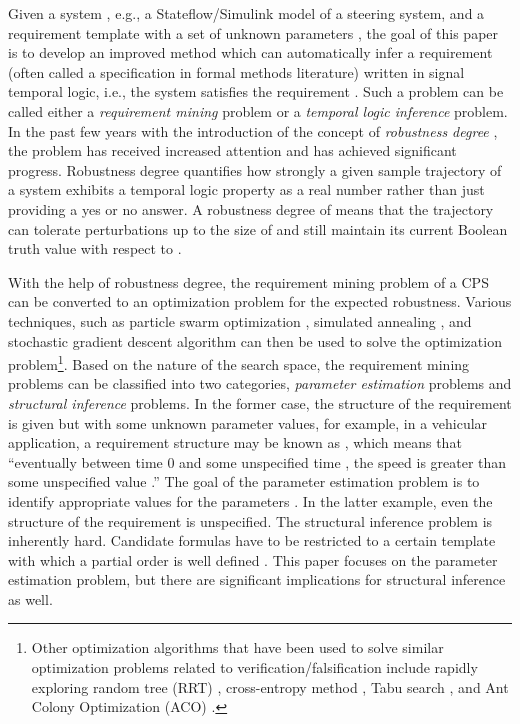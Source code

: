 \documentclass[10pt]{article}
\theoremstyle{plain}
\begin{document}
Given a system , e.g., a Stateflow/Simulink model of a steering system, and a requirement template  with a set of unknown parameters , the goal of this paper is to develop an improved method which can automatically infer a requirement  (often called a specification in formal methods literature) written in signal temporal logic, i.e., the system  satisfies the requirement . Such a problem can be called either a \emph{requirement mining} problem or a \emph{temporal logic inference} problem. In the past few years with the introduction of the concept of \emph{robustness degree} \cite{donze2010robust,fainekos2009robustness}, the problem has received increased attention and has achieved significant progress. Robustness degree quantifies how strongly a given sample trajectory  of a system  exhibits a temporal logic property  as a real number rather than just providing a yes or no answer. A robustness degree of  means that the trajectory  can tolerate perturbations up to the size of  and still maintain its current Boolean truth value with respect to .

With the help of robustness degree, the requirement mining problem of a CPS can be converted to an optimization problem for the expected robustness. Various techniques, such as particle swarm optimization \cite{haghighi2015spatel}, simulated annealing \cite{kong2014temporal}, and stochastic gradient descent algorithm \cite{kong2016TAC} can then be used to solve the optimization problem\footnote{Other optimization algorithms that have been used to solve similar optimization problems related to verification/falsification include rapidly exploring random tree (RRT) \cite{dreossi2015efficient}, cross-entropy method \cite{sankaranarayanan2012falsification}, Tabu search \cite{abbas2011linear}, and Ant Colony Optimization (ACO) \cite{annpureddy2011s}.}. Based on the nature of the search space, the requirement mining problems can be classified into two categories, \emph{parameter estimation} problems and \emph{structural inference} problems. In the former case, the structure of the requirement is given but with some unknown parameter values, for example, in a vehicular application, a requirement structure may be known as , which means that ``eventually between time 0 and some unspecified time , the speed  is greater than some unspecified value .'' The goal of the parameter estimation problem is to identify appropriate values for the parameters \cite{bartocci2014data,jin2013mining}. In the latter example, even the structure of the requirement is unspecified. The structural inference problem is inherently hard. Candidate formulas have to be restricted to a certain template with which a partial order is well defined \cite{kong2014temporal,kong2016TAC,jones2014anomaly}. This paper focuses on the parameter estimation problem, but there are significant implications for structural inference as well.
\end{document}
